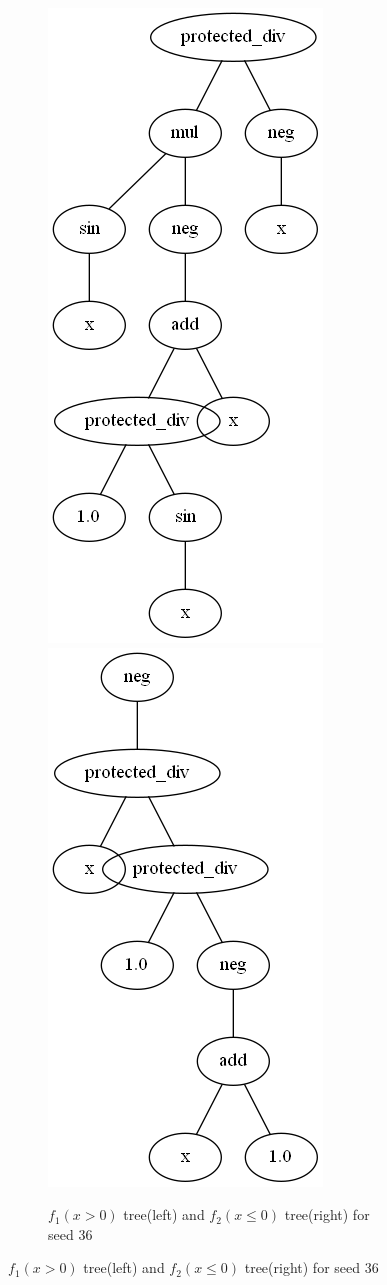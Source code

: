 \documentclass{article}
\begin{document}
\begin{figure}[h!]
	\centering
	\begin{subfigure}[b]{\linewidth}
		\includegraphics[width=0.5\linewidth]{ccgp_best_tree_36_1.png}
		\includegraphics[width=0.5\linewidth]{ccgp_best_tree_36_2.png}
		\caption{$f_1(x > 0)$ tree(left) and $f_2(x \le 0)$ tree(right) for seed 36}
	\end{subfigure}
\end{figure}
\end{document}
